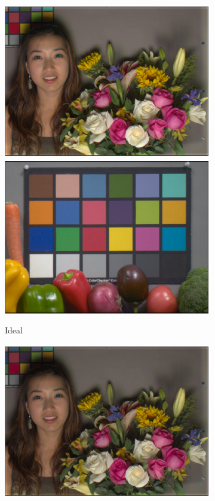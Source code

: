\documentclass[]{spie}
\begin{document}
\begin{figure}
\begin{center}
\begin{subfigure}[b]{0.3\textwidth}
    \includegraphics[width=\textwidth]{FaceId}
    \includegraphics[width=\textwidth]{VeggieId}
    \caption{Ideal}
\end{subfigure}
\begin{subfigure}[b]{0.3\textwidth}
    \includegraphics[width=\textwidth]{FaceTunXI}

\end{subfigure}
\end{center}
\end{figure}
\end{document}
